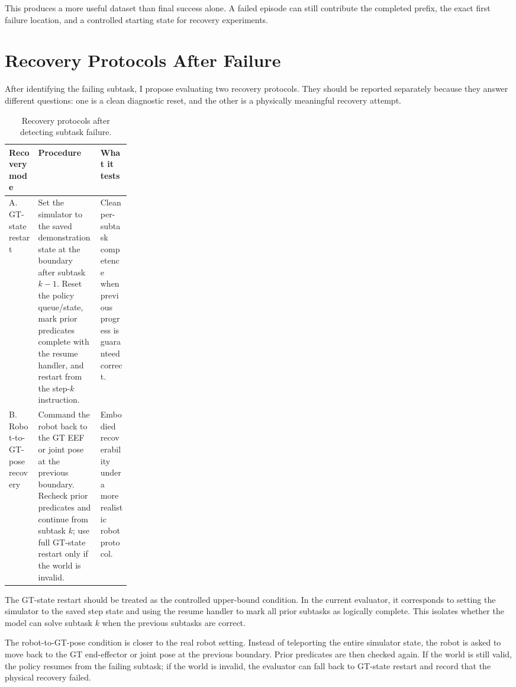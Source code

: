 \documentclass[11pt]{article}
\begin{document}
This produces a more useful dataset than final success alone. A failed episode can still contribute the completed prefix, the exact first failure location, and a controlled starting state for recovery experiments.

\section{Recovery Protocols After Failure}

After identifying the failing subtask, I propose evaluating two recovery protocols. They should be reported separately because they answer different questions: one is a clean diagnostic reset, and the other is a physically meaningful recovery attempt.

\begin{table}[htbp]
\centering
\caption{Recovery protocols after detecting subtask failure.}
\begin{tabularx}{\linewidth}{>{\raggedright\arraybackslash}p{0.24\linewidth}Y Y}
\toprule
\textbf{Recovery mode} & \textbf{Procedure} & \textbf{What it tests} \\
\midrule
A. GT-state restart & Set the simulator to the saved demonstration state at the boundary after subtask $k-1$. Reset the policy queue/state, mark prior predicates complete with the resume handler, and restart from the step-$k$ instruction. & Clean per-subtask competence when previous progress is guaranteed correct. \\
B. Robot-to-GT-pose recovery & Command the robot back to the GT EEF or joint pose at the previous boundary. Recheck prior predicates and continue from subtask $k$; use full GT-state restart only if the world is invalid. & Embodied recoverability under a more realistic robot protocol. \\
\bottomrule
\end{tabularx}
\end{table}

The GT-state restart should be treated as the controlled upper-bound condition. In the current evaluator, it corresponds to setting the simulator to the saved step state and using the resume handler to mark all prior subtasks as logically complete. This isolates whether the model can solve subtask $k$ when the previous subtasks are correct.

The robot-to-GT-pose condition is closer to the real robot setting. Instead of teleporting the entire simulator state, the robot is asked to move back to the GT end-effector or joint pose at the previous boundary. Prior predicates are then checked again. If the world is still valid, the policy resumes from the failing subtask; if the world is invalid, the evaluator can fall back to GT-state restart and record that the physical recovery failed.
\end{document}
